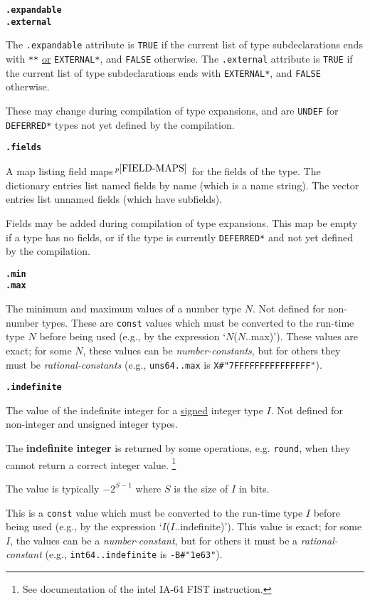 \documentclass[12pt]{article}
\newcommand{\key}[1]{{\rm \bfseries #1}}
\newcommand{\ttkey}[1]{{\tt \bfseries #1}}
\newcommand{\pagnote}[1]{$\,^{p\pageref{#1}}$}
\newenvironment{indpar}[1][0.3in]%
	{\begin{list}{}%
		     {\setlength{\itemsep}{0in}%
		      \setlength{\topsep}{0in}%
		      \setlength{\parsep}{1ex}%
		      \setlength{\labelwidth}{#1}%
		      \setlength{\leftmargin}{#1}%
		      \addtolength{\leftmargin}{\labelsep}}%
	 \item}%
	{\end{list}}
\begin{document}
\ttkey{.expandable} \\
\ttkey{.external}
\begin{indpar}
The {\tt .expandable} attribute is {\tt TRUE} if the
current list of type subdeclarations ends with
{\tt ***} \underline{or} {\tt *EXTERNAL*},
and {\tt FALSE} otherwise.
The {\tt .external} attribute is {\tt TRUE} if the current
list of type subdeclarations ends with
{\tt *EXTERNAL*}, and {\tt FALSE} otherwise.

These may change during compilation of type expansions, and are
{\tt UNDEF} for {\tt *DEFER\-RED*} types not yet defined by the
compilation.
\end{indpar}

\ttkey{.fields}
\begin{indpar}
A map listing field maps\pagnote{FIELD-MAPS} for the fields of the type.
The dictionary entries list named fields by name (which is a name string).
The vector entries list unnamed fields
(which have subfields).

Fields may be added during compilation of type expansions.
This map be empty if a type has no fields, or if the type is
currently {\tt *DEFERRED*} and not yet defined by the
compilation.
\end{indpar}

\ttkey{.min} \\
\ttkey{.max}
\begin{indpar}
The minimum and maximum values of a number type $N$.  Not defined for
non-number types.  These are {\tt const} values which must be
converted to the run-time type $N$ before being used
(e.g., by the expression `$N$($N$..max)').  These values are exact;
for some $N$, these values can be {\em number-constants}, but
for others they must be {\em rational-constants}
(e.g., {\tt uns64..max} is {\tt X\#"7FFFFFFFFFFFFFFF"}).
\end{indpar}

\ttkey{.indefinite}
\begin{indpar}
The value of the indefinite integer for a \underline{signed} integer type $I$.
Not defined for non-integer and unsigned integer types.

The \key{indefinite integer}\label{INDEFINITE-INTEGER} is returned by
some operations, e.g. {\tt round},
when they cannot return a correct integer value.%
\footnote{See documentation of the intel IA-64 FIST instruction.}

The value is typically $-2^{S-1}$ where $S$ is the size of $I$ in bits.

This is a {\tt const} value which must be
converted to the run-time type $I$ before being used
(e.g., by the expression `$I$($I$..indefinite)').  This value is exact;
for some $I$, the values can be a {\em number-constant}, but
for others it must be a {\em rational-constant}
(e.g., {\tt int64..indefinite} is {\tt -B\#"1e63"}).
\end{indpar}
\end{document}
